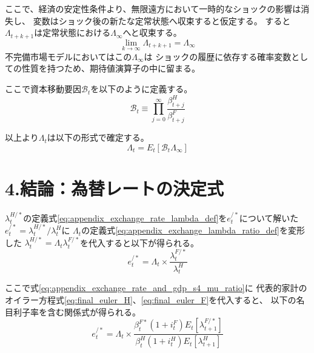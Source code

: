 ここで、経済の安定性条件より、無限遠方において一時的なショックの影響は消失し、
変数はショック後の新たな定常状態へ収束すると仮定する。
すると\(\Lambda_{t+k+1}\)は定常状態における\(\Lambda_{\infty}\)へと収束する。
\begin{equation}
    \lim_{k\to\infty}\Lambda_{t+k+1}=\Lambda_{\infty}
    \label{eq:appendix_exchange_rate_and_gdp_s3_lambda_convergence}
\end{equation}
不完備市場モデルにおいてはこの\(\Lambda_{\infty}\)は
ショックの履歴に依存する確率変数としての性質を持つため、期待値演算子の中に留まる。

ここで資本移動要因\(\mathcal{B}_t\)を以下のように定義する。
\begin{equation}
    \mathcal{B}_t\equiv\prod_{j=0}^{\infty}\frac{\beta_{t+j}^H}{\beta_{t+j}^F}
    \label{eq:appendix_exchange_rate_and_gdp_s3_bt_def}
\end{equation}

以上より\(\Lambda_t\)は以下の形式で確定する。
\begin{equation}
    \Lambda_t=E_t\left[\mathcal{B}_t\Lambda_{\infty}\right]
    \label{eq:appendix_exchange_rate_and_gdp_s3_lambda_final_solution}
\end{equation}

\section*{4.結論：為替レートの決定式}
\label{sec:appendix_exchange_rate_and_gdp_s4}

\(\lambda_t^{H/*}\)の定義式\eqref{eq:appendix_exchange_rate_lambda_def}を\(e_t^{/*}\)について解いた
\(e_t^{/*}=\lambda_t^{H/*}/\lambda_t^H\)に
\(\Lambda_t\)の定義式\eqref{eq:appendix_exchange_lambda_ratio_def}を変形した
\(\lambda_t^{H/*}=\Lambda_t\lambda_t^{F/*}\)を代入すると以下が得られる。
\begin{equation}
    e_t^{/*}=\Lambda_t\times\frac{\lambda_t^{F/*}}{\lambda_t^H}
    \label{eq:appendix_exchange_rate_and_gdp_s4_mu_ratio}
\end{equation}

ここで式\eqref{eq:appendix_exchange_rate_and_gdp_s4_mu_ratio}に
代表的家計のオイラー方程式\eqref{eq:final_euler_H}、\eqref{eq:final_euler_F}を代入すると、
以下の名目利子率を含む関係式が得られる。
\begin{equation}
    e_t^{/*}=\Lambda_t\times\frac{\beta_t^{F*}(1+i_t^F)E_t[\lambda_{t+1}^{F/*}]}{\beta_t^H(1+i_t^H)E_t[\lambda_{t+1}^H]}
    \label{eq:appendix_exchange_rate_and_gdp_s4_euler_ratio}
\end{equation}

